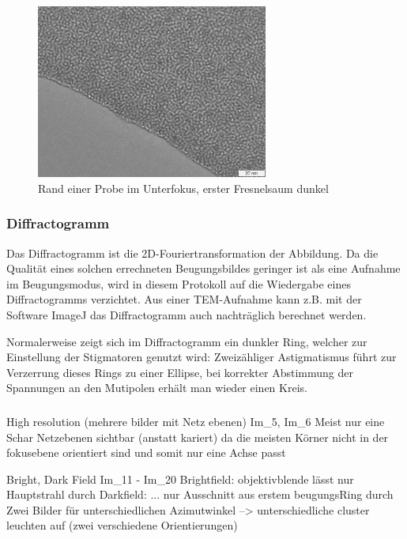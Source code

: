 \begin{figure}[p]
	\centering
	\includegraphics[width=0.68\textwidth]{data/Im_2.jpg}
	\vspace{-1.5ex}
	\caption{Rand einer Probe im Unterfokus, erster Fresnelsaum dunkel}	\label{fig:Ueber}
	\vspace{-9em}
\end{figure}

\subsubsection{Diffractogramm}
Das Diffractogramm ist die 2D-Fouriertransformation der Abbildung. Da die Qualität eines solchen errechneten Beugungsbildes geringer ist als eine Aufnahme im Beugungsmodus, wird in diesem Protokoll auf die Wiedergabe eines Diffractogramms verzichtet. Aus einer TEM-Aufnahme kann z.B. mit der Software ImageJ das Diffractogramm auch nachträglich berechnet werden.


Normalerweise zeigt sich im Diffractogramm ein dunkler Ring, welcher zur Einstellung der Stigmatoren genutzt wird: Zweizähliger Astigmatismus führt zur Verzerrung dieses Rings zu einer Ellipse, bei korrekter Abstimmung der Spannungen an den Mutipolen erhält man wieder einen Kreis.

\subsubsection{}
High resolution (mehrere bilder mit Netz ebenen)
Im_5, Im_6
Meist nur eine Schar Netzebenen sichtbar (anstatt kariert) da die meisten Körner nicht in der fokusebene orientiert sind und somit nur eine Achse passt


Bright, Dark Field
Im_11 - Im_20
Brightfield: objektivblende lässt nur Hauptstrahl durch
Darkfield: ... nur Ausschnitt aus erstem beugungsRing durch
Zwei Bilder für unterschiedlichen Azimutwinkel --> unterschiedliche cluster leuchten auf (zwei verschiedene Orientierungen)



